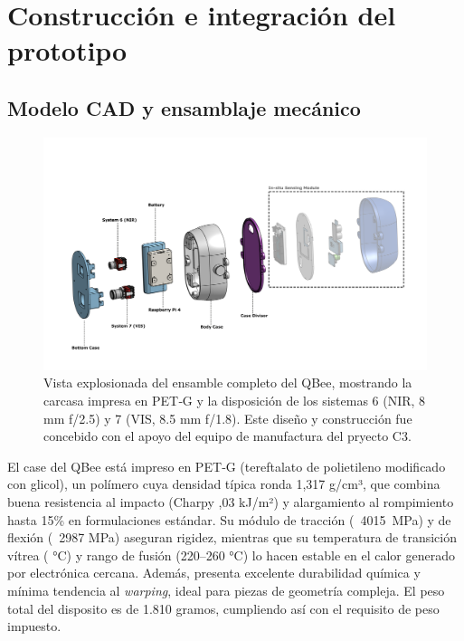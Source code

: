 \section{Construcción e integración del prototipo}
  \subsection{Modelo CAD y ensamblaje mecánico}

    \begin{figure}[h]
        \centering
        \includegraphics[width=1\linewidth]{Figures/C4/QBee.pdf}
        \caption{Vista explosionada del ensamble completo del QBee, mostrando la carcasa impresa en PET‑G y la disposición de los sistemas 6 (NIR, 8 mm f/2.5) y 7 (VIS, 8.5 mm f/1.8). Este diseño y construcción fue concebido con el apoyo del equipo de manufactura del pryecto C3.}
        \label{fig:exploded_assembly}
    \end{figure}

    El case del QBee está impreso en PET‑G (tereftalato de polietileno modificado con glicol), un polímero cuya densidad típica ronda 1,317 g/cm³, que combina buena resistencia al impacto (Charpy ,03 kJ/m²) y alargamiento al rompimiento hasta 15\% en formulaciones estándar. Su módulo de tracción (~4015 MPa) y de flexión (~2987 MPa) aseguran rigidez, mientras que su temperatura de transición vítrea ( °C) y rango de fusión (220–260 °C) lo hacen estable en el calor generado por electrónica cercana. Además, presenta excelente durabilidad química y mínima tendencia al \emph{warping}, ideal para piezas de geometría compleja. El peso total del disposito es de 1.810 gramos, cumpliendo así con el requisito de peso impuesto.\\

